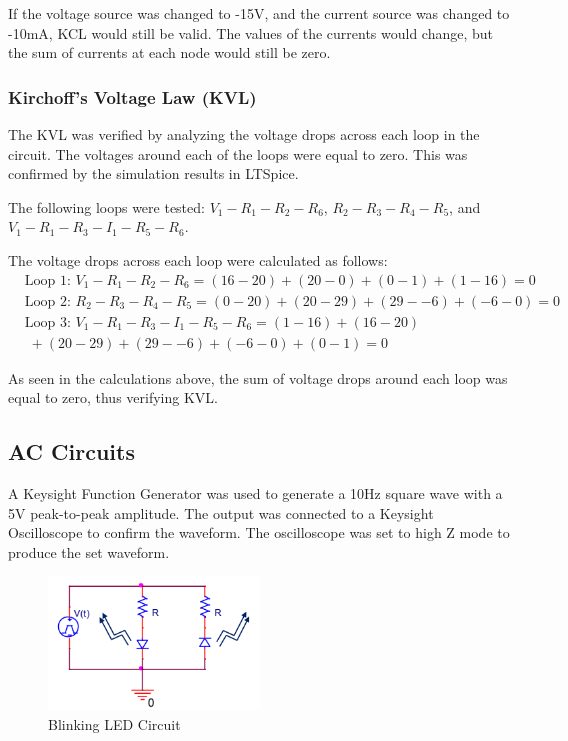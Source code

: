\documentclass{article}
\begin{document}
If the voltage source was changed to -15V, and the current source was changed to -10mA, KCL would still be valid.
The values of the currents would change, but the sum of currents at each node would still be zero.

\subsubsection{Kirchoff's Voltage Law (KVL)}
The KVL was verified by analyzing the voltage drops across each loop in the circuit.
The voltages around each of the loops were equal to zero.
This was confirmed by the simulation results in LTSpice.
\newline

The following loops were tested:
$V_1 - R_1 - R_2 - R_6$, $R_2 - R_3 - R_4 - R_5$, and $V_1 - R_1 - R_3 - I_1 - R_5 - R_6$.
\newline

The voltage drops across each loop were calculated as follows:
\begin{equation}
    \begin{split}
        &\text{Loop 1: } V_1 - R_1 - R_2 - R_6 = (16-20) + (20-0) + (0-1) + (1-16) = 0 \\
        &\text{Loop 2: } R_2 - R_3 - R_4 - R_5 = (0-20) + (20-29) + (29--6) + (-6-0) = 0 \\
        &\text{Loop 3: } V_1 - R_1 - R_3 - I_1 - R_5 - R_6 = (1-16) + (16-20) \\
            & \; + (20-29) + (29--6) + (-6-0) + (0-1) = 0
    \end{split}
\end{equation}

As seen in the calculations above, the sum of voltage drops around each loop was equal to zero, thus verifying KVL.

\subsection{AC Circuits}
A Keysight Function Generator was used to generate a 10Hz square wave with a 5V peak-to-peak amplitude. The output was
connected to a Keysight Oscilloscope to confirm the waveform. The oscilloscope was set to high Z mode to produce the set waveform.

\begin{figure}[H]
	\centering
	\includegraphics[width=0.5\textwidth]{Blinking LED Circuit.png}
	\caption{Blinking LED Circuit}
	\label{fig:fig2}
\end{figure}
\end{document}
